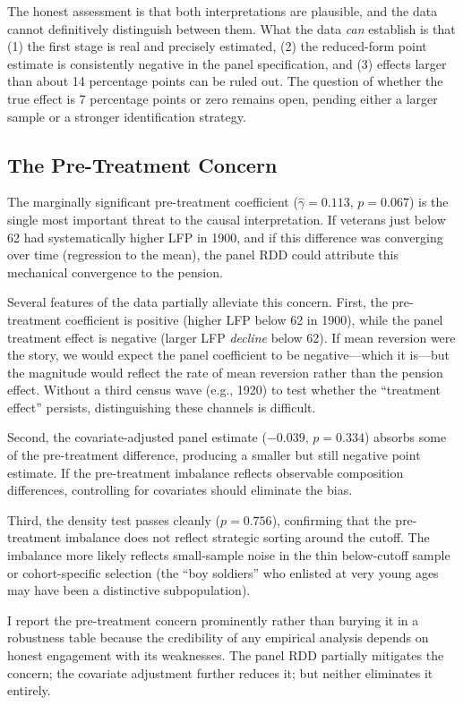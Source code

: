\documentclass[12pt]{article}
\begin{document}
The honest assessment is that both interpretations are plausible, and the data cannot definitively distinguish between them. What the data \textit{can} establish is that (1) the first stage is real and precisely estimated, (2) the reduced-form point estimate is consistently negative in the panel specification, and (3) effects larger than about 14 percentage points can be ruled out. The question of whether the true effect is 7 percentage points or zero remains open, pending either a larger sample or a stronger identification strategy.

\subsection{The Pre-Treatment Concern}

The marginally significant pre-treatment coefficient ($\hat{\gamma} = 0.113$, $p = 0.067$) is the single most important threat to the causal interpretation. If veterans just below 62 had systematically higher LFP in 1900, and if this difference was converging over time (regression to the mean), the panel RDD could attribute this mechanical convergence to the pension.

Several features of the data partially alleviate this concern. First, the pre-treatment coefficient is positive (higher LFP below 62 in 1900), while the panel treatment effect is negative (larger LFP \textit{decline} below 62). If mean reversion were the story, we would expect the panel coefficient to be negative---which it is---but the magnitude would reflect the rate of mean reversion rather than the pension effect. Without a third census wave (e.g., 1920) to test whether the ``treatment effect'' persists, distinguishing these channels is difficult.

Second, the covariate-adjusted panel estimate ($-0.039$, $p = 0.334$) absorbs some of the pre-treatment difference, producing a smaller but still negative point estimate. If the pre-treatment imbalance reflects observable composition differences, controlling for covariates should eliminate the bias.

Third, the density test passes cleanly ($p = 0.756$), confirming that the pre-treatment imbalance does not reflect strategic sorting around the cutoff. The imbalance more likely reflects small-sample noise in the thin below-cutoff sample or cohort-specific selection (the ``boy soldiers'' who enlisted at very young ages may have been a distinctive subpopulation).

I report the pre-treatment concern prominently rather than burying it in a robustness table because the credibility of any empirical analysis depends on honest engagement with its weaknesses. The panel RDD partially mitigates the concern; the covariate adjustment further reduces it; but neither eliminates it entirely.
\end{document}
